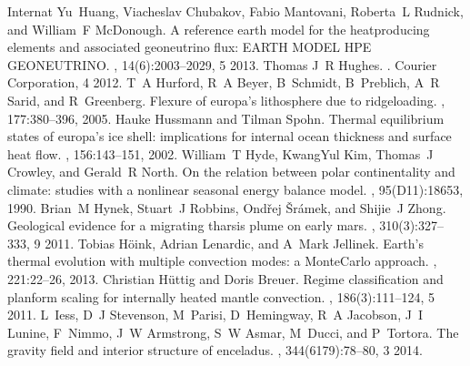 \documentclass[letterpaper,10pt,english]{jupyterBook}
\begin{document}
\begin{sphinxthebibliography}{Internat}
\sphinxAtStartPar
Yu Huang, Viacheslav Chubakov, Fabio Mantovani, Roberta L Rudnick, and William F McDonough. A reference earth model for the heat\sphinxhyphen{}producing elements and associated geoneutrino flux: EARTH MODEL HPE GEONEUTRINO. , 14(6):2003–2029, 5 2013.
\sphinxAtStartPar
Thomas J R Hughes. . Courier Corporation, 4 2012.
\sphinxAtStartPar
T A Hurford, R A Beyer, B Schmidt, B Preblich, A R Sarid, and R Greenberg. Flexure of europa's lithosphere due to ridge\sphinxhyphen{}loading. , 177:380–396, 2005.
\sphinxAtStartPar
Hauke Hussmann and Tilman Spohn. Thermal equilibrium states of europa's ice shell: implications for internal ocean thickness and surface heat flow. , 156:143–151, 2002.
\sphinxAtStartPar
William T Hyde, Kwang\sphinxhyphen{}Yul Kim, Thomas J Crowley, and Gerald R North. On the relation between polar continentality and climate: studies with a nonlinear seasonal energy balance model. , 95(D11):18653, 1990.
\sphinxAtStartPar
Brian M Hynek, Stuart J Robbins, Ondřej Šrámek, and Shijie J Zhong. Geological evidence for a migrating tharsis plume on early mars. , 310(3):327–333, 9 2011.
\sphinxAtStartPar
Tobias Höink, Adrian Lenardic, and A Mark Jellinek. Earth's thermal evolution with multiple convection modes: a Monte\sphinxhyphen{}Carlo approach. , 221:22–26, 2013.
\sphinxAtStartPar
Christian Hüttig and Doris Breuer. Regime classification and planform scaling for internally heated mantle convection. , 186(3):111–124, 5 2011.
\sphinxAtStartPar
L Iess, D J Stevenson, M Parisi, D Hemingway, R A Jacobson, J I Lunine, F Nimmo, J W Armstrong, S W Asmar, M Ducci, and P Tortora. The gravity field and interior structure of enceladus. , 344(6179):78–80, 3 2014.
\sphinxAtStartPar

\end{sphinxthebibliography}
\end{document}

